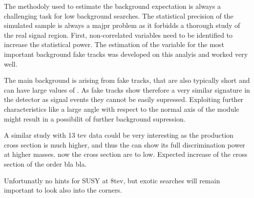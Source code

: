 The methodoly used to estimate the background expectation is always a challenging task for low background searches. 
The statistical precision of the simulated sample is always a majpr problem as it forbidds a thorough study of the real signal region.
First, non-correlated variables need to be identified to increase the statistical power.
The estimation of the \ias variable for the most important background fake tracks was developed on this analyis and worked very well.

The main background is arising from fake tracks, that are also typically short and can have large values of \ias.
As fake tracks show therefore a very similar signature in the detector as signal events they cannot be easily supressed.
Exploiting further characteristics like a large angle with respect to the normal axis of the module might result in a possibilit of further background supression.

A similar study with 13 tev data could be very interesting as the production cross section is much higher, and thus the \ias can show its full discrimination power at higher masses. now the cross section are to low.
Expected increase of the cross section of the order bla bla.

Unfortunatly no hints for SUSY at 8tev, but exotic searches will remain important to look also into the corners.
